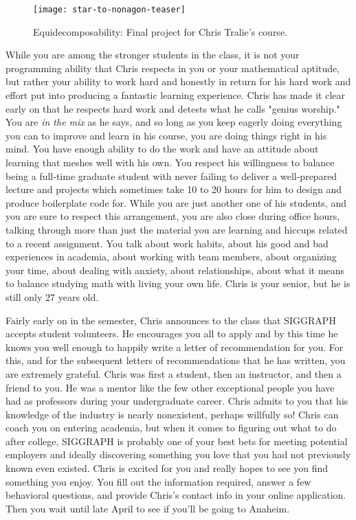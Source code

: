 \documentclass[../main.tex]{subfiles}
\begin{document}
\begin{figure}[h!]
	\centering
	\texttt{[image: star-to-nonagon-teaser]}
	\caption*{Equidecomposability: Final project for Chris Tralie's course.}
\end{figure}

While you are among the stronger students in the class, it is not your programming ability that Chris respects in you or your mathematical aptitude, but rather your ability to work hard and honestly in return for his hard work and effort put into producing a fantastic learning experience. Chris has made it clear early on that he respects hard work and detests what he calls "genius worship." You are \textit{in the mix} as he says, and so long as you keep eagerly doing everything you can to improve and learn in his course, you are doing things right in his mind. You have enough ability to do the work and have an attitude about learning that meshes well with his own. You respect his willingness to balance being a full-time graduate student with never failing to deliver a well-prepared lecture and projects which sometimes take 10 to 20 hours for him to design and produce boilerplate code for. While you are just another one of his students, and you are sure to respect this arrangement, you are also close during office hours, talking through more than just the material you are learning and hiccups related to a recent assignment. You talk about work habits, about his good and bad experiences in academia, about working with team members, about organizing your time, about dealing with anxiety, about relationships, about what it means to balance studying math with living your own life. Chris is your senior, but he is still only 27 years old.

Fairly early on in the semester, Chris announces to the class that SIGGRAPH accepts student volunteers. He encourages you all to apply and by this time he knows you well enough to happily write a letter of recommendation for you. For this, and for the subsequent letters of recommendations that he has written, you are extremely grateful. Chris was first a student, then an instructor, and then a friend to you. He was a mentor like the few other exceptional people you have had as professors during your undergraduate career. Chris admits to you that his knowledge of the industry is nearly nonexistent, perhaps willfully so! Chris can coach you on entering academia, but when it comes to figuring out what to do after college, SIGGRAPH is probably one of your best bets for meeting potential employers and ideally discovering something you love that you had not previously known even existed. Chris is excited for you and really hopes to see you find something you enjoy. You fill out the information required, answer a few behavioral questions, and provide Chris's contact info in your online application. Then you wait until late April to see if you'll be going to Anaheim.
\end{document}
